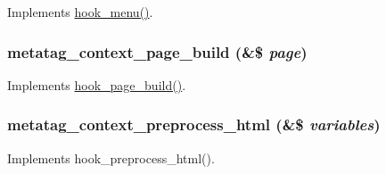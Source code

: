 \label{metatag__context_8module_a23526ae514a5ac48cb005f3953b5198e}
Implements \hyperlink{group__hooks_ga5c95244fea59b25666e409759e133ded}{hook\_\-menu()}. \hypertarget{metatag__context_8module_ae9aec377175590dfb274950b2efcca59}{
\subsubsection[{metatag\_\-context\_\-page\_\-build}]{\setlength{\rightskip}{0pt plus 5cm}metatag\_\-context\_\-page\_\-build (\&\$ {\em page})}}
\label{metatag__context_8module_ae9aec377175590dfb274950b2efcca59}
Implements \hyperlink{group__hooks_ga16d8d8ae818dc759bbe539e16ff5b93b}{hook\_\-page\_\-build()}. \hypertarget{metatag__context_8module_a4cd862515789578ba6c88c8df512f0d6}{
\subsubsection[{metatag\_\-context\_\-preprocess\_\-html}]{\setlength{\rightskip}{0pt plus 5cm}metatag\_\-context\_\-preprocess\_\-html (\&\$ {\em variables})}}
\label{metatag__context_8module_a4cd862515789578ba6c88c8df512f0d6}
Implements hook\_\-preprocess\_\-html(). 